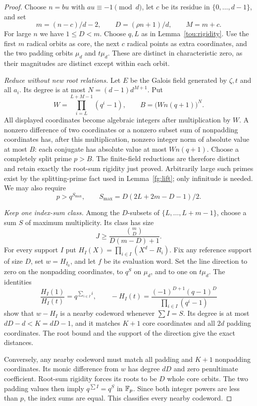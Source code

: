 \begin{proof}
Choose $n=bu$ with $au\equiv-1\pmod d$, let $c$ be its residue in
$\{0,\ldots,d-1\}$, and set
\[
 m=(n-c)/d-2,\qquad D=(\rho n+1)/d,\qquad M=m+c.
\]
For large $n$ we have $1\le D<m$. Choose $q,L$ as in
Lemma~\ref{tou:rigidity}. Use the first $m$ radical orbits as core,
the next $c$ radical points as extra coordinates, and the two padding
orbits $\mu_d$ and $t\mu_d$. These are distinct in characteristic zero,
as their magnitudes are distinct except within each orbit.

\emph{Reduce without new root relations.}
Let $E$ be the Galois field generated by $\zeta,t$ and all $a_i$.
Its degree is at most $N=(d-1)d^{M+1}$. Put
\[
 W=\prod_{i=L}^{L+M-1}(q^i-1),\qquad
 B=\bigl(Wn(q+1)\bigr)^N.
\]
All displayed coordinates become algebraic integers after multiplication
by $W$. A nonzero difference of two coordinates or a nonzero subset sum
of nonpadding coordinates has, after this multiplication, nonzero integer
norm of absolute value at most $B$: each conjugate has absolute value
at most $Wn(q+1)$. Choose a completely split prime $p>B$.
The finite-field reductions are therefore distinct and retain exactly
the root-sum rigidity just proved. Arbitrarily large such primes exist
by the splitting-prime fact used in Lemma~\ref{fg:lift}; only infinitude
is needed. We may also require
\[
 p>q^{S_{\max}},\qquad
 S_{\max}=D(2L+2m-D-1)/2.
\]

\emph{Keep one index-sum class.}
Among the $D$-subsets of $\{L,\ldots,L+m-1\}$, choose a sum $S$ of
maximum multiplicity. Its class has size
\[
 J\ge\frac{\binom mD}{D(m-D)+1}.
\]
For every support $I$ put
$H_I(X)=\prod_{i\in I}(X^d-R_i)$. Fix any reference support of size
$D$, set $w=H_{I_0}$, and let $f$ be its evaluation word. Set the
line direction to zero on the nonpadding coordinates, to $q^S$ on
$\mu_d$, and to one on $t\mu_d$.
The identities
\[
 \frac{H_I(1)}{H_I(t)}=q^{\sum_{i\in I}i},\qquad
 -H_I(t)=\frac{(-1)^{D+1}(q-1)^D}{\prod_{i\in I}(q^i-1)}
\]
show that $w-H_I$ is a nearby codeword whenever $\sum I=S$.
Its degree is at most $dD-d<K=dD-1$, and it matches $K+1$
core coordinates and all $2d$ padding coordinates.
The root bound and the support of the direction give the exact distances.

Conversely, any nearby codeword must match all padding and $K+1$
nonpadding coordinates. Its monic difference from $w$ has degree
$dD$ and zero penultimate coefficient. Root-sum rigidity forces its
roots to be $D$ whole core orbits. The two padding values then imply
$q^{\sum I}=q^S$ in $\mathbb F_p$. Since both integer powers are less than
$p$, the index sums are equal. This classifies every nearby codeword.


\end{proof}
